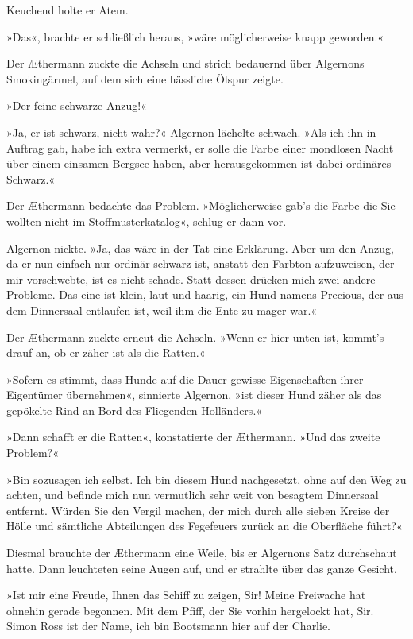 Keuchend holte er Atem.

»Das«, brachte er schließlich heraus, »wäre möglicherweise knapp
geworden.«

Der Æthermann zuckte die Achseln und strich bedauernd über
Algernons Smokingärmel, auf dem sich eine hässliche Ölspur zeigte.

»Der feine schwarze Anzug!«

»Ja, er ist schwarz, nicht wahr?« Algernon lächelte schwach. »Als
ich ihn in Auftrag gab, habe ich extra vermerkt, er solle die Farbe
einer mondlosen Nacht über einem einsamen Bergsee haben, aber
herausgekommen ist dabei ordinäres Schwarz.«

Der Æthermann bedachte das Problem. »Möglicherweise gab’s die Farbe
die Sie wollten nicht im Stoffmusterkatalog«, schlug er dann vor.

Algernon nickte. »Ja, das wäre in der Tat eine Erklärung. Aber um
den Anzug, da er nun einfach nur ordinär schwarz ist, anstatt den
Farbton aufzuweisen, der mir vorschwebte, ist es nicht schade.
Statt dessen drücken mich zwei andere Probleme. Das eine ist klein,
laut und haarig, ein Hund namens Precious, der aus dem Dinnersaal
entlaufen ist, weil ihm die Ente zu mager war.«

Der Æthermann zuckte erneut die Achseln. »Wenn er hier unten ist,
kommt’s drauf an, ob er zäher ist als die Ratten.«

»Sofern es stimmt, dass Hunde auf die Dauer gewisse Eigenschaften
ihrer Eigentümer übernehmen«, sinnierte Algernon, »ist dieser Hund
zäher als das gepökelte Rind an Bord des Fliegenden Holländers.«

»Dann schafft er die Ratten«, konstatierte der Æthermann. »Und das
zweite Problem?«

»Bin sozusagen ich selbst. Ich bin diesem Hund nachgesetzt, ohne
auf den Weg zu achten, und befinde mich nun vermutlich sehr weit
von besagtem Dinnersaal entfernt. Würden Sie den Vergil machen, der
mich durch alle sieben Kreise der Hölle und sämtliche Abteilungen
des Fegefeuers zurück an die Oberfläche führt?«

Diesmal brauchte der Æthermann eine Weile, bis er Algernons Satz
durchschaut hatte. Dann leuchteten seine Augen auf, und er strahlte
über das ganze Gesicht.

»Ist mir eine Freude, Ihnen das Schiff zu zeigen, Sir! Meine
Freiwache hat ohnehin gerade begonnen. Mit dem Pfiff, der Sie
vorhin hergelockt hat, Sir. Simon Ross ist der Name, ich bin
Bootsmann hier auf der Charlie.


